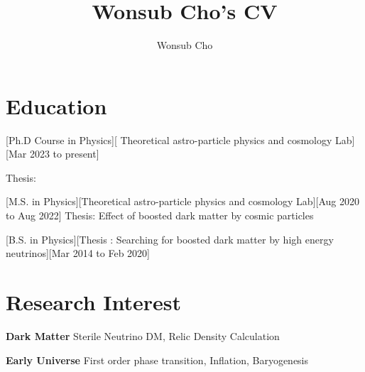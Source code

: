 \documentclass{article}
\title{Wonsub Cho's CV}
\author{Wonsub Cho}
\date{}
\begin{document}

\makecvtitle %

\section{Education}

[Ph.D Course in Physics][ Theoretical astro-particle physics and cosmology Lab][Mar 2023 to present]

Thesis:

[M.S. in Physics][Theoretical astro-particle physics and cosmology Lab][Aug 2020 to Aug 2022]
Thesis: Effect of boosted dark matter by cosmic particles

[B.S. in Physics][Thesis : Searching for boosted dark matter by high energy neutrinos][Mar 2014 to Feb 2020]

\section{Research Interest}

\begin{description}
\item \textbf{Dark Matter} Sterile Neutrino DM, Relic Density Calculation
\item \textbf{Early Universe} First order phase transition, Inflation, Baryogenesis 
\end{description}
 


\end{document}

